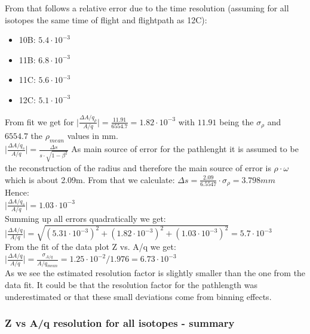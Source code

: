\documentclass[12pt, letterpaper]{article}
\begin{document}
From that follows a relative error due to the time resolution (assuming for all isotopes the same time of flight  and flightpath as 12C):\\
\begin{itemize}
\item 10B: $5.4 \cdot 10^{-3}$
\item 11B: $6.8 \cdot 10^{-3}$
\item 11C: $5.6 \cdot 10^{-3}$
\item 12C: $5.1 \cdot 10^{-3}$
\end{itemize}

From fit we get  for  $\big|\frac{\Delta A/q_{\rho}}{A/q}\big| = \frac{11.91}{6554.7} = 1.82\cdot 10^{-3}$ with $11.91$ being the $ \sigma_{\rho}$ and $6554.7$ the $\rho_{mean}$ values in mm.\\
\newline
$\big|\frac{\Delta A/q_{s}}{A/q}\big| = \frac{\Delta s}{s\cdot \sqrt{1- \beta^{2}}}$
As main source of error for the pathlenght it is assumed to be the reconstruction of the radius and therefore the main source of error is $\rho \cdot \omega$ which is about 2.09m. From that we calculate: 
$\Delta s = \frac{2.09}{6.5547}\cdot \sigma_{\rho} = 3.798mm $ \\
Hence:\\
$\big|\frac{\Delta A/q_{s}}{A/q}\big| = 1.03 \cdot 10^{-3}$\\
\newline
Summing up all errors quadratically we get:\\
$\Big|\frac{\Delta A/q}{A/q}\Big| = \sqrt{ (5.31\cdot 10^{-3})^{2} + (1.82 \cdot 10^{-3})^{2} + (1.03 \cdot 10^{-3})^{2}} = 5.7 \cdot 10^{-3}$ \\ 
\newline
From the fit of the data plot Z vs. A/q we get:\\
$\Big|\frac{\Delta A/q}{A/q}\Big| = \frac{\sigma_{A/q}}{A/q_{mean}} = 1.25 \cdot 10^{-2}/1.976 = 6.73 \cdot 10^{-3}$\\
\newline
As we see the estimated resolution factor is slightly smaller than the one from the data fit. It could be that the resolution factor for the pathlength was underestimated or that these small deviations come from binning effects.\\

\subsubsection{Z vs A/q resolution for all isotopes - summary}
\end{document}
